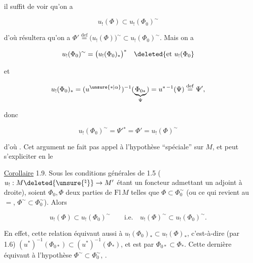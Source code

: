 il suffit de voir qu'on a

\[
u_!(\Phi)\subset u_!(\Phi_0)^{\sim}\tag*{$(*)$}
\]

d'où résultera qu'on a $\Phi'\overset{\mathrm{def}}{=}\big(u_!(\Phi)\big)^{\sim}\subset u_!(\Phi_0)^{\sim}$.
Mais on a

\[
u_!(\Phi_0)^{\sim}=\big(u_!(\Phi_0)_*\big)^*\quad \deleted{\text{et }u_!(\Phi_0}
\]

et

\[
u_!(\Phi_0)_*=(u^{\unsure{*|\alpha}})^{-1}(\underbrace{\Phi_{0*}}_{\Psi})=u^{*\, -1}(\Psi)\overset{\mathrm{def}}{=}\Psi',
\]

donc

\[
u_!(\Phi_0)^{\sim}=\Psi'{}^*=\Phi'=u_!(\Phi)^{\sim}
\]

d'où \unsure{(*)}. Cet argument ne fait pas appel
à l'hypothèse ``spéciale'' sur $M$, et peut
s'expliciter en le

\uline{Corollaire} 1.9. Sous les conditions générales de
\deleted{\unsure{(}}1.5\deleted{\unsure{)}} ($u_!:M\deleted{\unsure{^{\natural}}}\to M'$ étant un foncteur admettant
un adjoint à droite), soient $\Phi_0,\Phi$ deux
parties de $\mathrm{Fl}\,M$ telles que $\Phi\subset\Phi_0^{\sim}$ (ou ce
qui revient au $=$, $\Phi^{\sim}\subset\Phi_0^{\sim}$). Alors

\[
u_!(\Phi)\subset u_!(\Phi_0)^{\sim}\qquad\text{i.e.}\quad u_!(\Phi)^{\sim}\subset u_!(\Phi_0)^{\sim}.
\]

En effet, cette relation équivaut aussi à
$u_!(\Phi_0)_*\subset u_!(\Phi)_*$, c'est-à-dire (par 1.6)
$(u^*)^{-1}(\Phi_{0*})\subset(u^*)^{-1}(\Phi_*)$, et est 
par $\Phi_{0*}\subset\Phi_*$. Cette dernière 
équivaut à l'hypothèse $\Phi^{\sim}\subset\Phi_0^{\sim}$, .

\unsure{!}
